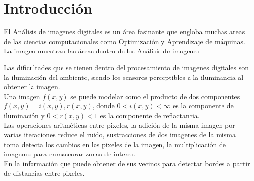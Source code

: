 \documentclass[a4paper, 11pt]{article}
\begin{document}
\section{Introducción}

El Análisis de imagenes digitales es un área fasinante que engloba muchas areas de las ciencias computacionales como Optimización y Aprendizaje de máquinas.\\

La imagen muestran las áreas dentro de los Análisis de imagenes

  


Las dificultades que se tienen dentro del procesamiento de imagenes digitales son la iluminación del ambiente, siendo los sensores perceptibles a la iluminancia al obtener la imagen.\\

Una imagen $f(x,y)$ se puede modelar como el producto de dos componentes $f(x,y) = i(x,y),r(x,y)$, donde $0<i(x,y)<\infty$ es la componente de iluminación y $0<r(x,y)<1$ es la componente de reflactancia.\\

Las operaciones aritméticas entre pixeles, la adición de la misma imagen por varias iteraciones reduce el ruido, sustracciones de dos imagenes de la misma toma detecta los cambios en los pixeles de la imagen, la multiplicación de imagenes para enmascarar zonas de interes.\\

En la información que puede obtener de sus vecinos para detectar bordes a partir de distancias entre pixeles.
\end{document}
